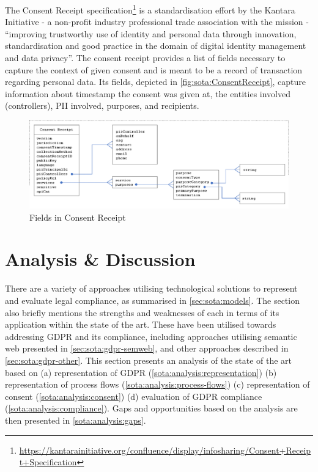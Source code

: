 
The Consent Receipt specification\footnote{\url{https://kantarainitiative.org/confluence/display/infosharing/Consent+Receipt+Specification}} \cite{lizar_consent_2017} is a standardisation effort by the Kantara Initiative - a non-profit industry professional trade association with the mission - ``improving trustworthy use of identity and personal data through innovation, standardisation and good practice in the domain of digital identity management and data privacy''. The consent receipt provides a list of fields necessary to capture the context of given consent and is meant to be a record of transaction regarding personal data. Its fields, depicted in \autoref{fig:sota:ConsentReceipt}, capture information about timestamp the consent was given at, the entities involved (controllers), PII involved, purposes, and recipients.
\begin{figure}[htbp]
    \centering
    \includegraphics[width=\linewidth]{img/ConsentReceipt.png}
    \caption{Fields in Consent Receipt \cite{lizar_consent_2017}}
    \label{fig:sota:ConsentReceipt}
\end{figure}

\section{Analysis \& Discussion}\label{sec:sota:analysis}

There are a variety of approaches utilising technological solutions to represent and evaluate legal compliance, as summarised in \autoref{sec:sota:models}.
The section also briefly mentions the strengths and weaknesses of each in terms of its application within the state of the art.
These have been utilised towards addressing GDPR and its compliance, including approaches utilising semantic web presented in \autoref{sec:sota:gdpr-semweb}, and other approaches described in \autoref{sec:sota:gdpr-other}. This section presents an analysis of the state of the art based on (a) representation of GDPR (\autoref{sota:analysis:representation}) (b) representation of process flows (\autoref{sota:analysis:process-flows}) (c) representation of consent (\autoref{sota:analysis:consent}) (d) evaluation of GDPR compliance (\autoref{sota:analysis:compliance}). Gaps and opportunities based on the analysis are then presented in \autoref{sota:analysis:gaps}.

